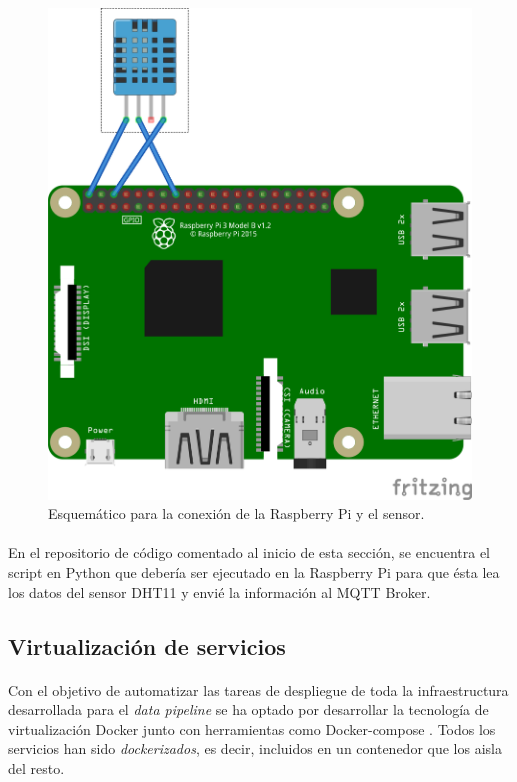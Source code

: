 \documentclass[12pt, a4paper]{article}
\begin{document}
        \begin{figure}[ht]
            \centerline{\includegraphics[width=0.6\paperwidth]{schema}}
            \caption{Esquemático para la conexión de la Raspberry Pi y el sensor.}
            \label{fig-schema}
        \end{figure}

        \paragraph{}
        En el repositorio de código comentado al inicio de esta sección, se encuentra el script en Python que debería ser ejecutado en la Raspberry Pi para que ésta lea los datos del sensor DHT11 y envié la información al MQTT Broker.

        \subsection{Virtualización de servicios}
        
        \paragraph{}
        Con el objetivo de automatizar las tareas de despliegue de toda la infraestructura desarrollada para el \textit{data pipeline} se ha optado por desarrollar la tecnología de virtualización Docker \cite{docker} junto con herramientas como Docker-compose \cite{docker-compose}. Todos los servicios han sido \textit{dockerizados}, es decir, incluidos en un contenedor que los aisla del resto. 
\end{document}
